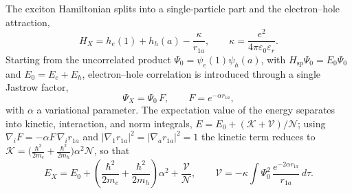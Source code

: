 The exciton Hamiltonian splits into a single-particle part and the
electron--hole attraction,
\begin{equation}
  H_X=h_e(1)+h_h(a)-\frac{\kappa}{r_{1a}},
  \qquad
  \kappa=\frac{e^{2}}{4\pi\varepsilon_0\varepsilon_r}.
  \label{eq:Hx}
\end{equation}
Starting from the uncorrelated product $\Psi_0=\psi_e(1)\psi_h(a)$, with
$H_{\mathrm{sp}}\Psi_0=E_0\Psi_0$ and $E_0=E_e+E_h$, electron--hole correlation
is introduced through a single Jastrow factor,
\begin{equation}
  \Psi_X=\Psi_0\,F,\qquad F=e^{-\alpha r_{1a}},
  \label{eq:Xtrial}
\end{equation}
with $\alpha$ a variational parameter. The expectation value of the energy
separates into kinetic, interaction, and norm integrals,
$E=E_0+(\mathcal K+\mathcal V)/\mathcal N$; using
$\nabla_iF=-\alpha F\,\nabla_i r_{1a}$ and $|\nabla_1 r_{1a}|^{2}=|\nabla_a r_{1a}|^{2}=1$
the kinetic term reduces to
$\mathcal K=\big(\tfrac{\hbar^{2}}{2m_e}+\tfrac{\hbar^{2}}{2m_h}\big)\alpha^{2}\mathcal N$,
so that
\begin{equation}
  E_X=E_0+\left(\frac{\hbar^{2}}{2m_e}+\frac{\hbar^{2}}{2m_h}\right)\alpha^{2}
  +\frac{\mathcal V}{\mathcal N},
  \qquad
  \mathcal V=-\kappa\!\int\!\Psi_0^{2}\,\frac{e^{-2\alpha r_{1a}}}{r_{1a}}\,d\tau .
  \label{eq:Xenergy}
\end{equation}

